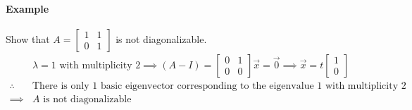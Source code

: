 \paragraph*{Example}
Show that $A = \begin{bmatrix}
    1 & 1 \\
    0 & 1
\end{bmatrix}$ is not diagonalizable.
\begin{align*}
    &\lambda = 1 \text{ with multiplicity } 2 \implies (A - I) = \begin{bmatrix}
    0 & 1 \\
    0 & 0
\end{bmatrix} \vec{x} = \vec{0} \implies \vec{x} = t \begin{bmatrix}
    1 \\
    0
\end{bmatrix} \\
\therefore \quad &\text{There is only 1 basic eigenvector corresponding to the eigenvalue } 1 \text{ with multiplicity } 2 \\
\implies &A \text{ is not diagonalizable}
\end{align*}


